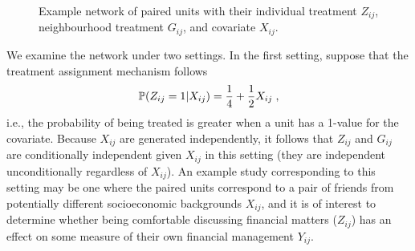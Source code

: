 \documentclass[10pt]{article}
\begin{document}
\begin{figure}[ht]
\centering
{}
\caption{Example network of paired units with their individual treatment $Z_{ij}$, neighbourhood treatment $G_{ij}$, and covariate $X_{ij}$.}
\label{fig:example}
\end{figure}

We examine the network under two settings. In the first setting, suppose that the treatment assignment mechanism follows
\[
\P(Z_{ij}=1|X_{ij}) = \frac{1}{4} + \frac{1}{2}X_{ij} \;,
\]
i.e., the probability of being treated is greater when a unit has a 1-value for the covariate.
Because $X_{ij}$ are generated independently, it follows that $Z_{ij}$ and $G_{ij}$ are conditionally independent given $X_{ij}$ in this setting (they are independent unconditionally regardless of $X_{ij}$). An example study corresponding to this setting may be one where the paired units correspond to a pair of friends from potentially different socioeconomic backgrounds $X_{ij}$, and it is of interest to determine whether being comfortable discussing financial matters ($Z_{ij}$) has an effect on some measure of their own financial management $Y_{ij}$.
\\
\end{document}
